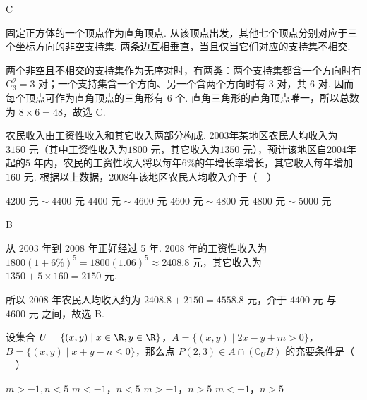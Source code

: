 \begin{answer}
C
\end{answer}

\begin{solution}
固定正方体的一个顶点作为直角顶点. 从该顶点出发，其他七个顶点分别对应于三个坐标方向的非空支持集. 两条边互相垂直，当且仅当它们对应的支持集不相交.

两个非空且不相交的支持集作为无序对时，有两类：两个支持集都含一个方向时有 \(\mathrm C_3^2=3\) 对；一个支持集含一个方向、另一个含两个方向时有 \(3\) 对，共 \(6\) 对. 因而每个顶点可作为直角顶点的三角形有 \(6\) 个. 直角三角形的直角顶点唯一，所以总数为 \(8\times6=48\)，故选 C.
\end{solution}

\begin{problem}
农民收入由工资性收入和其它收入两部分构成. 2003年某地区农民人均收入为\(3150\text{ 元}\)（其中工资性收入为\(1800\text{ 元}\)，其它收入为\(1350\text{ 元}\)），预计该地区自2004年起的\(5\text{ 年}\)内，农民的工资性收入将以每年\(6\%\)的年增长率增长，其它收入每年增加\(160\text{ 元}\). 根据以上数据，2008年该地区农民人均收入介于（\(\quad\)）

\choices
    {\(4200\text{ 元}\sim 4400\text{ 元}\)}
    {\(4400\text{ 元}\sim 4600\text{ 元}\)}
    {\(4600\text{ 元}\sim 4800\text{ 元}\)}
    {\(4800\text{ 元}\sim 5000\text{ 元}\)}
\end{problem}

\begin{answer}
B
\end{answer}

\begin{solution}
从 2003 年到 2008 年正好经过 5 年. 2008 年的工资性收入为
\(1800(1+6\%)^5=1800(1.06)^5\approx2408.8\text{ 元}\)，其它收入为
\(1350+5\times160=2150\text{ 元}\).

所以 2008 年农民人均收入约为 \(2408.8+2150=4558.8\text{ 元}\)，介于 \(4400\text{ 元}\) 与 \(4600\text{ 元}\) 之间，故选 B.
\end{solution}

\begin{problem}
设集合 \(U = \{(x, y) \mid x \in \R, y \in \R\}\)，\(A = \{(x, y) \mid 2x - y + m > 0\}\)，\(B = \{(x, y) \mid x + y - n \leqslant 0\}\)，那么点 \(P(2,3) \in A \cap (\complement_U B)\) 的充要条件是（\(\quad\)）

\choices
    {\(m > -1, n < 5\)}
    {\(m < -1\)，\(n < 5\)}
    {\(m > -1\)，\(n > 5\)}
    {\(m < -1\)，\(n > 5\)}
\end{problem}

